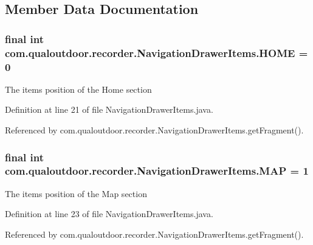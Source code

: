 \subsection{Member Data Documentation}
\hypertarget{classcom_1_1qualoutdoor_1_1recorder_1_1NavigationDrawerItems_afadd3e94707fd15b43fe32e89256f1f1}{
\subsubsection[{H\-O\-M\-E}]{\setlength{\rightskip}{0pt plus 5cm}final int com.\-qualoutdoor.\-recorder.\-Navigation\-Drawer\-Items.\-H\-O\-M\-E = 0\hspace{0.3cm}{\ttfamily [static]}}}\label{classcom_1_1qualoutdoor_1_1recorder_1_1NavigationDrawerItems_afadd3e94707fd15b43fe32e89256f1f1}
The items position of the Home section 

Definition at line 21 of file Navigation\-Drawer\-Items.\-java.



Referenced by com.\-qualoutdoor.\-recorder.\-Navigation\-Drawer\-Items.\-get\-Fragment().

\hypertarget{classcom_1_1qualoutdoor_1_1recorder_1_1NavigationDrawerItems_ad8e672418abc393ea6a4df48e97352ef}{
\subsubsection[{M\-A\-P}]{\setlength{\rightskip}{0pt plus 5cm}final int com.\-qualoutdoor.\-recorder.\-Navigation\-Drawer\-Items.\-M\-A\-P = 1\hspace{0.3cm}{\ttfamily [static]}}}\label{classcom_1_1qualoutdoor_1_1recorder_1_1NavigationDrawerItems_ad8e672418abc393ea6a4df48e97352ef}
The items position of the Map section 

Definition at line 23 of file Navigation\-Drawer\-Items.\-java.



Referenced by com.\-qualoutdoor.\-recorder.\-Navigation\-Drawer\-Items.\-get\-Fragment().

